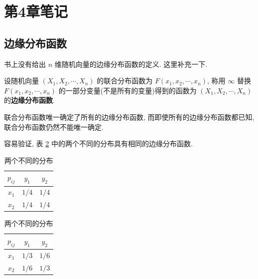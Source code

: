 \documentclass[color=black,device=normal,lang=cn]{elegantnote}
\numberwithin{equation}{section}
\theoremstyle{plain}
\numberwithin{exercise}{exsection}
\begin{document}
\section{第4章笔记}
\subsection{边缘分布函数}
书上没有给出 $n$ 维随机向量的边缘分布函数的定义. 这里补充一下.
\begin{definition}
    设随机向量 $(X_1,X_2,\cdots,X_n)$ 的联合分布函数为 $F(x_1,x_2,\cdots,x_n)$, 称用 $\infty$ 替换 $F(x_1,x_2,\cdots,x_n)$ 的一部分变量(不是所有的变量)得到的函数为 $(X_1,X_2,\cdots,X_n)$ 的\textbf{边缘分布函数}.
\end{definition}

联合分布函数唯一确定了所有的边缘分布函数, 而即使所有的边缘分布函数都已知, 联合分布函数仍然不能唯一确定.
\begin{example}
    容易验证, 表 \ref{tb1} 中的两个不同的分布具有相同的边缘分布函数.
\end{example}
\begin{table}[htbp!]
    \centering
    \begin{tabular}{c|cc}
        $p_{ij}$ & $y_1$ & $y_2$ \\
        \hline
        $x_1$    & $1/4$ & $1/4$ \\
        $x_2$    & $1/4$ & $1/4$ \\
    \end{tabular}\quad\quad
    \begin{tabular}{c|cc}
        $p_{ij}$ & $y_1$ & $y_2$ \\
        \hline
        $x_1$    & $1/3$ & $1/6$ \\
        $x_2$    & $1/6$ & $1/3$ \\
    \end{tabular}
    \caption{两个不同的分布}\label{tb1}
\end{table}
\end{document}
